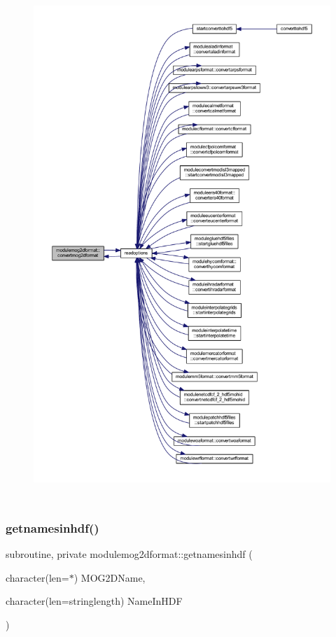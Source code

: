 \begin{figure}[H]
\begin{center}
\leavevmode
\includegraphics[height=550pt]{namespacemodulemog2dformat_a734bfcb7f534ab9c91af8672cea24021_icgraph}
\end{center}
\end{figure}
\mbox{\label{namespacemodulemog2dformat_af9424852561b70ff9a6dd1f247d73c37}} 
\subsubsection{\texorpdfstring{getnamesinhdf()}{getnamesinhdf()}}
{\footnotesize\ttfamily subroutine, private modulemog2dformat\+::getnamesinhdf (\begin{DoxyParamCaption}\item[{character(len=$\ast$)}]{M\+O\+G2\+D\+Name,  }\item[{character(len=stringlength)}]{Name\+In\+H\+DF }\end{DoxyParamCaption})\hspace{0.3cm}{\ttfamily [private]}}

